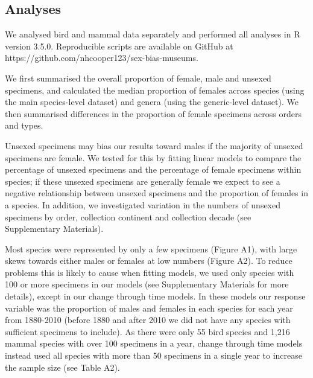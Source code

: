 \documentclass[a4paper, 12pt]{article}
\begin{document}
\subsection{Analyses}
We analysed bird and mammal data separately and performed all analyses in R version 3.5.0\cite{R}. 
Reproducible scripts are available on GitHub at https://github.com/nhcooper123/sex-bias-museums\cite{coopercode2019}.

We first summarised the overall proportion of female, male and unsexed specimens, and calculated the median proportion of females across species (using the main species-level dataset) and genera (using the generic-level dataset). 
We then summarised differences in the proportion of female specimens across orders and types. 

Unsexed specimens may bias our results toward males if the majority of unsexed specimens are female. 
We tested for this by fitting linear models to compare the percentage of unsexed specimens and the percentage of female specimens within species; if these unsexed specimens are generally female we expect to see a negative relationship between unsexed specimens and the proportion of females in a species. 
In addition, we investigated variation in the numbers of unsexed specimens by order, collection continent and collection decade (see Supplementary Materials).

Most species were represented by only a few specimens (Figure A1), with large skews towards either males or females at low numbers (Figure A2). 
To reduce problems this is likely to cause when fitting models, we used only species with 100 or more specimens in our models (see Supplementary Materials for more details), except in our change through time models. 
In these models our response variable was the proportion of males and females in each species for each year from 1880-2010 (before 1880 and after 2010 we did not have any species with sufficient specimens to include). 
As there were only 55 bird species and 1,216 mammal species with over 100 specimens in a year, change through time models instead used all species with more than 50 specimens in a single year to increase the sample size (see Table A2).
\end{document}
